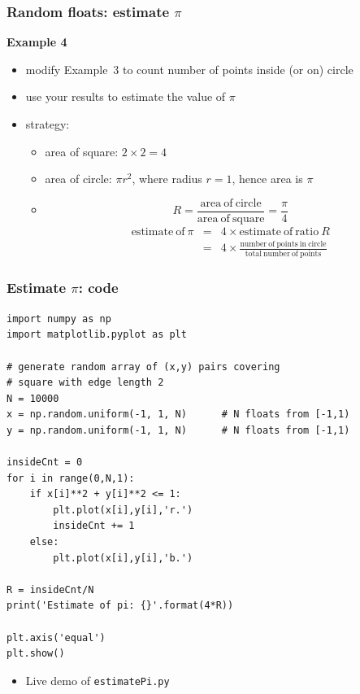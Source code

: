 \documentclass[english,14pt]{beamer}
\begin{document}

\begin{frame}[fragile]

\frametitle{Random floats: estimate $\pi$}

\textbf{Example 4}\\
\begin{itemize}
	\item modify Example~3 to count number of points inside (or on) circle
	\item use your results to estimate the value of $\pi$
	\pause
	\item strategy:
	\begin{itemize}
		\item area of square: $2 \times 2 = 4$
		\item area of circle: $\pi r^2$, where radius $r=1$, hence area is $\pi$
		\item[]
		\[
			R = \frac{\mathrm{area~of~circle}}{\mathrm{area~of~square}} = \frac{\pi}{4}
		\]
		\pause		
		\begin{eqnarray*}
			\mathrm{estimate~of~} \pi & = & 4\times \mathrm{estimate~of~ratio~} R \\
			& =& 4 \times \frac{\mathrm{number~of~points~in~circle}}{\mathrm{total~number~of~points}}
		\end{eqnarray*}
	\end{itemize}
\end{itemize}

\end{frame}


\begin{frame}[fragile]

\frametitle{Estimate $\pi$: code}
\vspace*{-5mm}
\begin{lstlisting}[style=CStyle,basicstyle=\scriptsize]
import numpy as np
import matplotlib.pyplot as plt

# generate random array of (x,y) pairs covering
# square with edge length 2
N = 10000
x = np.random.uniform(-1, 1, N)      # N floats from [-1,1)
y = np.random.uniform(-1, 1, N)      # N floats from [-1,1)

insideCnt = 0
for i in range(0,N,1):
    if x[i]**2 + y[i]**2 <= 1:
        plt.plot(x[i],y[i],'r.')
        insideCnt += 1
    else:
        plt.plot(x[i],y[i],'b.')

R = insideCnt/N
print('Estimate of pi: {}'.format(4*R))

plt.axis('equal')
plt.show()
\end{lstlisting}
\vspace*{-3mm}
\begin{itemize}
	\item Live demo of \texttt{estimatePi.py}
\end{itemize}
\end{frame}
\end{document}
